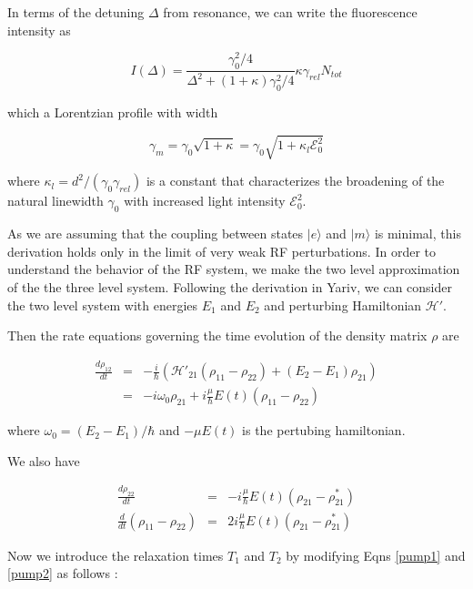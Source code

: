 In terms of the detuning $\Delta$ from resonance, we can write the fluorescence intensity as

\begin{equation}
I(\Delta) = \frac{\gamma_0^2/4}{\Delta^2 +(1+\kappa)\gamma_0^2/4}\kappa\gamma_{rel}N_{tot}
\end{equation}

which a Lorentzian profile with width

\begin{equation}
\gamma_m = \gamma_0\sqrt{1+\kappa} = \gamma_0\sqrt{1+\kappa_l\mathcal{E}_0^2}
\end{equation}

where $\kappa_l = d^2/(\gamma_0\gamma_{rel})$ is a constant that
characterizes the broadening of the natural linewidth $\gamma_0$ with
increased light intensity $\mathcal{E}_0^2$.



As we are assuming that the coupling between states $|e\rangle$ and
$|m\rangle$ is minimal, this derivation holds only in the limit of
very weak RF perturbations. In order to understand the behavior of the
RF system, we make the two level approximation of the the three level
system. Following the derivation in Yariv, we can consider the two
level system with energies $E_1$ and $E_2$ and perturbing Hamiltonian
$\mathcal{H}'$.

Then the rate equations governing the time evolution of the density matrix $\rho$ are 

\begin{eqnarray}
\frac{d\rho_{12}}{dt} &=& -\frac{i}{\hbar}(\mathcal{H}'_{21}(\rho_{11} - \rho_{22}) + (E_2 - E_1)\rho_{21}) \\
 &=& -i\omega_0\rho_{21} + i\frac{\mu}{\hbar}E(t)(\rho_{11} - \rho_{22})
\label{pump1}
\end{eqnarray}

where $\omega_0 = (E_2 - E_1)/\hbar$ and $-\mu E(t)$ is the pertubing
hamiltonian.

We also have

\begin{eqnarray}
\frac{d\rho_{22}}{dt} &=& -i\frac{\mu}{\hbar}E(t)(\rho_{21} - \rho_{21}^*)\\
\frac{d}{dt}(\rho_{11} - \rho_{22}) &=& 2i\frac{\mu}{\hbar}E(t)(\rho_{21} - \rho_{21}^*)
\label{pump2}
\end{eqnarray}

Now we introduce the relaxation times $T_1$ and $T_2$ by modifying Eqns \ref{pump1} and \ref{pump2} as follows \cite{yariv}:

